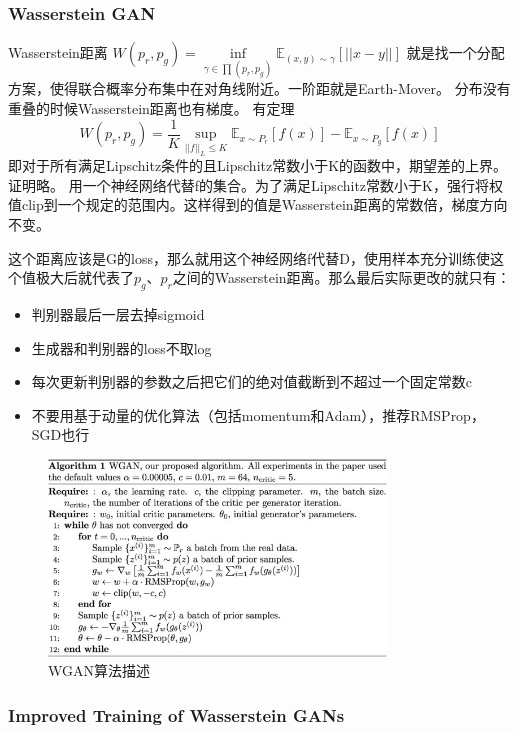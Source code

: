 \documentclass[a4paper]{article}
\begin{document}
\subsubsection{Wasserstein GAN\cite{DBLP:journals/corr/ArjovskyCB17}}
Wasserstein距离
$W(p_r,p_g)=\inf\limits_{\gamma\in \prod (p_r,p_g) }\mathbb{E}_{(x,y)\sim \gamma}[||x - y||]$
就是找一个分配方案，使得联合概率分布集中在对角线附近。一阶距就是Earth-Mover。
分布没有重叠的时候Wasserstein距离也有梯度。
有定理$$W(p_r,p_g) = \frac{1}{K}\sup\limits_{||f||_L\leq K}\mathbb{E}_{x\sim P_r}[f(x)]-\mathbb{E}_{x\sim P_g}[f(x)]$$
即对于所有满足Lipschitz条件的且Lipschitz常数小于K的函数中，期望差的上界。证明略。
用一个神经网络代替f的集合。为了满足Lipschitz常数小于K，强行将权值clip到一个规定的范围内。这样得到的值是Wasserstein距离的常数倍，梯度方向不变。

这个距离应该是G的loss，那么就用这个神经网络f代替D，使用样本充分训练使这个值极大后就代表了$p_g、p_r$之间的Wasserstein距离。那么最后实际更改的就只有：
\begin{itemize}

\item 判别器最后一层去掉sigmoid
\item 生成器和判别器的loss不取log
\item 每次更新判别器的参数之后把它们的绝对值截断到不超过一个固定常数c
\item 不要用基于动量的优化算法（包括momentum和Adam），推荐RMSProp，SGD也行
\end{itemize}
\begin{figure}
\centering
\includegraphics[width=0.8\textwidth]{./img/5.jpg}
\caption{WGAN算法描述}
\label{fig:5}
\end{figure}
\subsubsection{Improved Training of Wasserstein GANs\cite{DBLP:journals/corr/GulrajaniAADC17}}
\end{document}
